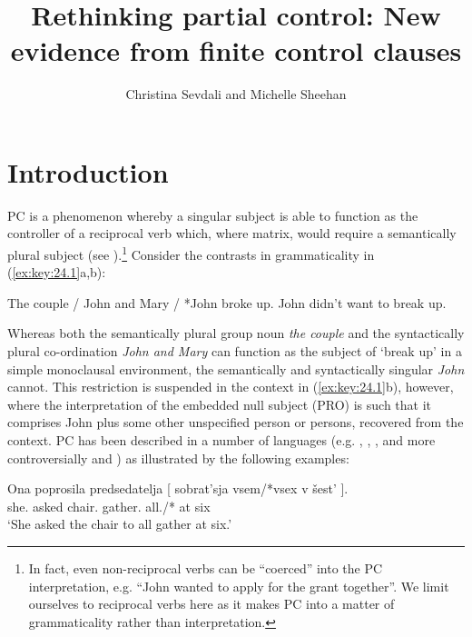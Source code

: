 \documentclass[output=paper]{langsci/langscibook}
\author{Christina Sevdali\affiliation{Ulster University} and Michelle Sheehan\affiliation{Anglia Ruskin University}}
\title{Rethinking partial control: New evidence from finite control clauses}
\begin{document}
\glsresetall
\maketitle

\section{Introduction}\label{sec:key:24.1}

\Gls{PC} is a
phenomenon whereby a singular subject is able to function as the controller of
a reciprocal verb which, where matrix, would require a semantically plural
subject (see \citealt{Landau2000}).\footnote{In fact, even non-reciprocal verbs
    can be “coerced” into the \gls{PC}
    interpretation, e.g. “John wanted to apply for the grant together”. We limit
    ourselves to reciprocal verbs here as it makes \gls{PC} into a matter of grammaticality rather than interpretation.} Consider
the contrasts in grammaticality in (\ref{ex:key:24.1}a,b):\largerpage[1]

\ea\label{ex:key:24.1}
	\ea The couple / John and Mary / *John broke up.
	\ex John didn’t want to break up.
	\z
\z

Whereas both the semantically plural group noun \emph{the couple} and the
syntactically plural co-ordination \emph{John and Mary} can function as the
subject of ‘break up’ in a simple monoclausal environment, the semantically and
syntactically singular \emph{John} cannot. This restriction is suspended in
the  context in (\ref{ex:key:24.1}b), however, where the interpretation of the embedded
null subject (PRO) is such that it comprises John plus some other unspecified
person or persons, recovered from the context. \gls{PC} has been described in a number of languages (e.g. ,
, ,  and more
controversially  and ) as
illustrated by the following examples:

\ea\label{ex:key:24.2}  \parencite[909]{Landau2008}
    \sn
	\gll    Ona   poprosila   predsedatelja [ sobrat’sja   vsem/*vsex   v šest’ ].\\
    she.\Nom{}   asked  chair.\Acc{} {} gather.\Inf{}   all.\Dat{}/*\Acc{}  at six\\
	\glt    ‘She asked the chair to all gather at six.’
\z
\end{document}
